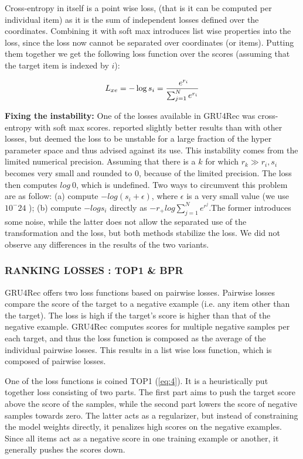 Cross-entropy in itself is a point wise loss, (that is it can be computed per individual item) as it is the sum of independent losses defined over the coordinates. Combining it with soft max introduces
list wise properties into the loss, since the loss now cannot be separated over coordinates (or items). Putting them together we get the following loss function over the scores (assuming that the target
item is indexed by $i$):

\begin{equation}\label{eq:3}
    L_{xe} = - \log s_i = \frac{\ e^{r_i} }{\sum_{j=1}^{N} \\ e^{r_i}}
\end{equation}

\textbf{Fixing the instability:} One of the losses available in GRU4Rec was cross-entropy with soft max scores. \cite{hidasi2016a} reported slightly better results than with other losses, but deemed the loss to be unstable for a large fraction of the hyper parameter space and thus advised against its use. This instability comes from the limited numerical precision. Assuming that there is a $k$ for which $r_k \gg  r_i , s_i$ becomes very small and rounded to 0, because of the limited precision. The loss
then computes $log \ 0$, which is undefined. Two ways to circumvent this problem are as follow: (a)
compute $− log(s_i +\epsilon)$, where $\epsilon$ is a very small value (we use $10^−24$ ); (b) compute $− log s_i$ directly as $−r _+log \sum_{j=1}^{N} e^{ r^j }. $The former introduces some noise, while the latter does not allow the separated use of the transformation and the loss, but both methods stabilize the loss. We did not observe any differences in the results of the two variants.

\subsubsection{RANKING LOSSES : TOP1 & BPR}
GRU4Rec offers two loss functions based on pairwise losses. Pairwise losses compare the score of the target to a negative example (i.e. any item other than the target). The loss is high if the target’s score is higher than that of the negative example. GRU4Rec computes scores for multiple negative samples per each target, and thus the loss function is composed as the average of the individual
pairwise losses. This results in a list wise loss function, which is composed of pairwise losses.

One of the loss functions is coined TOP1 (\ref{eq:4}). It is a heuristically put together loss consisting of two
parts. The first part aims to push the target score above the score of the samples, while the second
part lowers the score of negative samples towards zero. The latter acts as a regularizer, but instead
of constraining the model weights directly, it penalizes high scores on the negative examples. Since
all items act as a negative score in one training example or another, it generally pushes the scores
down.

